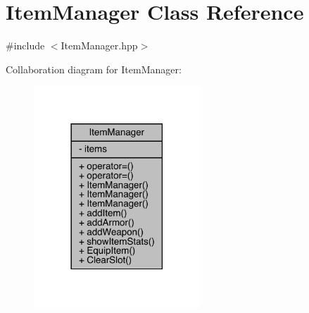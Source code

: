 \hypertarget{class_item_manager}{}\section{Item\+Manager Class Reference}
\label{class_item_manager}


{\ttfamily \#include $<$Item\+Manager.\+hpp$>$}



Collaboration diagram for Item\+Manager\+:
\nopagebreak
\begin{figure}[H]
\begin{center}
\leavevmode
\includegraphics[width=177pt]{d2/d0e/class_item_manager__coll__graph}
\end{center}
\end{figure}
